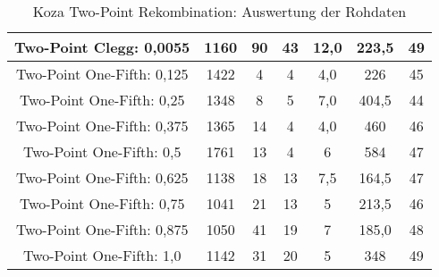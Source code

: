\begin{table}[H]
\begin{tabular}{c | c | c | c | c | c | c}
		\hline
		Two-Point Clegg: 0,0055 & 1160 & 90 & 43 & 12,0 & 223,5 & 49\\
		\hline
		Two-Point One-Fifth: 0,125 & 1422 & 4 & 4 & 4,0 & 226 & 45\\
		\hline
		Two-Point One-Fifth: 0,25 & 1348 & 8 & 5 & 7,0 & 404,5 & 44\\
		\hline
		Two-Point One-Fifth: 0,375 & 1365 & 14 & 4 & 4,0 & 460 & 46\\
		\hline
		Two-Point One-Fifth: 0,5 & 1761 & 13 & 4 & 6 & 584 & 47\\
		\hline
		Two-Point One-Fifth: 0,625 & 1138 & 18 & 13 & 7,5 & 164,5 & 47\\
		\hline
		Two-Point One-Fifth: 0,75 & 1041 & 21 & 13 & 5 & 213,5 & 46\\
		\hline
		Two-Point One-Fifth: 0,875 & 1050 & 41 & 19 & 7 & 185,0 & 48\\
		\hline
		Two-Point One-Fifth: 1,0 & 1142 & 31 & 20 & 5 & 348 & 49\\
	\end{tabular}
	\caption{Koza Two-Point Rekombination: Auswertung der Rohdaten}
	\label{table:kozaTwoPointRohdaten}
\end{table}

